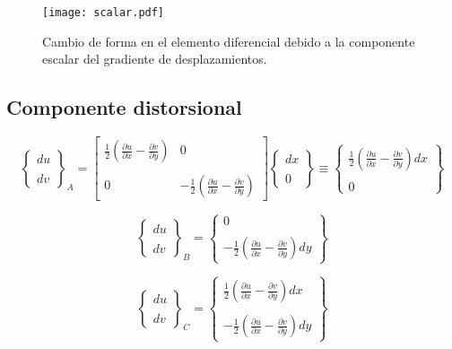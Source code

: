 \documentclass[../notas medios.tex]{subfiles}
\begin{document}
\begin{figure}[H]
\centering
	\texttt{[image: scalar.pdf]}
	\caption{Cambio de forma en el elemento diferencial debido a la componente escalar del gradiente de desplazamientos.}
	\label{scalar}
\end{figure}

\subsection{Componente distorsional}

\[{\left\{ {\begin{array}{*{20}{c}}
{du}\\\\
{dv}
\end{array}} \right\}_A} = \left[ {\begin{array}{*{20}{c}}
{\frac{1}{2}\left( {\frac{{\partial u}}{{\partial x}} - \frac{{\partial v}}{{\partial y}}} \right)}&0\\\\
0&{ - \frac{1}{2}\left( {\frac{{\partial u}}{{\partial x}} - \frac{{\partial v}}{{\partial y}}} \right)}
\end{array}} \right]\left\{ {\begin{array}{*{20}{c}}
{dx}\\\\
0
\end{array}} \right\} \equiv \left\{ {\begin{array}{*{20}{c}}
{\frac{1}{2}\left( {\frac{{\partial u}}{{\partial x}} - \frac{{\partial v}}{{\partial y}}} \right)dx}\\\\
0
\end{array}} \right\}\]

\[{\left\{ {\begin{array}{*{20}{c}}
{du}\\\\
{dv}
\end{array}} \right\}_B} = \left\{ {\begin{array}{*{20}{c}}
0\\\\
{ - \frac{1}{2}\left( {\frac{{\partial u}}{{\partial x}} - \frac{{\partial v}}{{\partial y}}} \right)dy}
\end{array}} \right\}\]

\[{\left\{ {\begin{array}{*{20}{c}}
{du}\\\\
{dv}
\end{array}} \right\}_C} = \left\{ {\begin{array}{*{20}{c}}
{\frac{1}{2}\left( {\frac{{\partial u}}{{\partial x}} - \frac{{\partial v}}{{\partial y}}} \right)dx}\\\\
{ - \frac{1}{2}\left( {\frac{{\partial u}}{{\partial x}} - \frac{{\partial v}}{{\partial y}}} \right)dy}
\end{array}} \right\}\]
\end{document}

